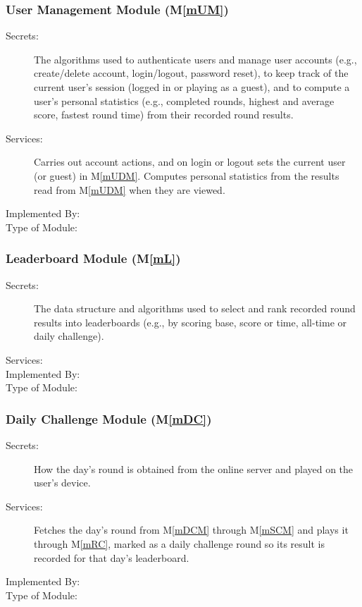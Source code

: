 \documentclass[12pt, titlepage]{article}
\newcommand{\mref}[1]{M\ref{#1}}
\begin{document}
\subsubsection{User Management Module (\mref{mUM})}

\begin{description}
\item[Secrets:] The algorithms used to authenticate users and manage user accounts (e.g., create/delete account, login/logout, password reset), to keep track of the current user's session (logged in or playing as a guest), and to compute a user's personal statistics (e.g., completed rounds, highest and average score, fastest round time) from their recorded round results.
\item[Services:] Carries out account actions, and on login or logout sets the current user (or guest) in \mref{mUDM}. Computes personal statistics from the results read from \mref{mUDM} when they are viewed.
\item[Implemented By:]
\item[Type of Module:]
\end{description}

\subsubsection{Leaderboard Module (\mref{mL})}

\begin{description}
\item[Secrets:] The data structure and algorithms used to select and rank recorded round results into leaderboards (e.g., by scoring base, score or time, all-time or daily challenge).
\item[Services:]
\item[Implemented By:]
\item[Type of Module:]
\end{description}

\subsubsection{Daily Challenge Module (\mref{mDC})}

\begin{description}
\item[Secrets:] How the day's round is obtained from the online server and played on the user's device.
\item[Services:] Fetches the day's round from \mref{mDCM} through \mref{mSCM} and plays it through \mref{mRC}, marked as a daily challenge round so its result is recorded for that day's leaderboard.
\item[Implemented By:]
\item[Type of Module:]
\end{description}
\end{document}
